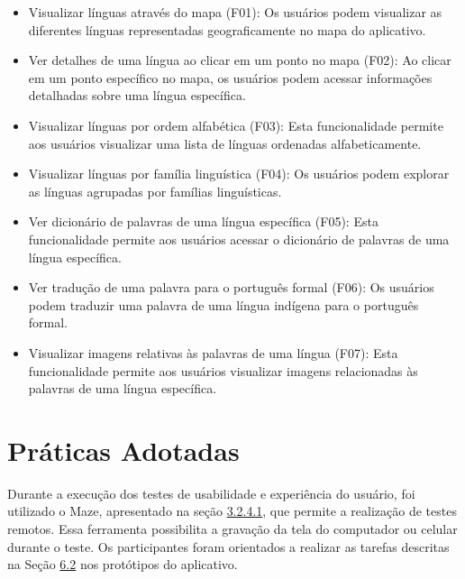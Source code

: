 \begin{itemize}

	\item Visualizar línguas através do mapa (F01): Os usuários podem visualizar as diferentes línguas representadas geograficamente no mapa do aplicativo.

    \item Ver detalhes de uma língua ao clicar em um ponto no mapa (F02): Ao clicar em um ponto específico no mapa, os usuários podem acessar informações detalhadas sobre uma língua específica.
    
    \item Visualizar línguas por ordem alfabética (F03): Esta funcionalidade permite aos usuários visualizar uma lista de línguas ordenadas alfabeticamente.
    
    \item Visualizar línguas por família linguística (F04): Os usuários podem explorar as línguas agrupadas por famílias linguísticas.
    
    \item Ver dicionário de palavras de uma língua específica (F05): Esta funcionalidade permite aos usuários acessar o dicionário de palavras de uma língua específica.
    
    \item Ver tradução de uma palavra para o português formal (F06): Os usuários podem traduzir uma palavra de uma língua indígena para o português formal.
    
    \item  Visualizar imagens relativas às palavras de uma língua (F07): Esta funcionalidade permite aos usuários visualizar imagens relacionadas às palavras de uma língua específica.

\end{itemize}

\section{Práticas Adotadas}
\label{sec:Práticas Adotadas}
Durante a execução dos testes de usabilidade e experiência do usuário, foi utilizado o Maze, apresentado na seção \hyperref[{sec:Maze}]{3.2.4.1}, que permite a realização de testes remotos. Essa ferramenta possibilita a gravação da tela do computador ou celular 
durante o teste. Os participantes foram orientados a realizar as tarefas descritas na Seção \hyperref[sec:Cenários de Uso]{6.2} nos protótipos do aplicativo.

